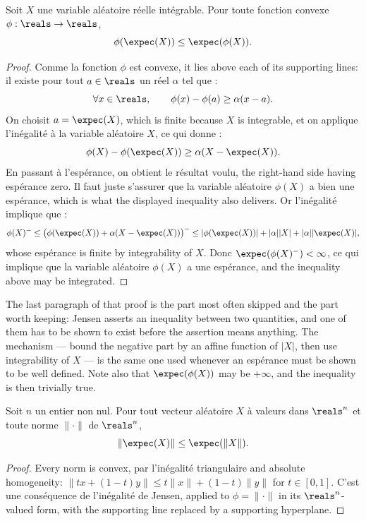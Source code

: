 \begin{theorem}
  Soit $X$ une variable aléatoire réelle intégrable. Pour toute fonction convexe
  $\phi : \reals \to \reals$,
  \[
    \phi(\expec(X)) \leq \expec(\phi(X)).
  \]
\end{theorem}

\begin{proof}
  Comme la fonction $\phi$ est convexe, it lies above each of its supporting
  lines: il existe pour tout $a \in \reals$ un réel $\alpha$ tel que :
  \[
    \forall x \in \reals, \qquad \phi(x) - \phi(a) \geq \alpha(x-a).
  \]
  On choisit $a = \expec(X)$, which is finite because $X$ is integrable, et on
  applique l'inégalité à la variable aléatoire $X$, ce qui donne :
  \[
    \phi(X) - \phi(\expec(X)) \geq \alpha (X - \expec(X)).
  \]
  En passant à l'espérance, on obtient le résultat voulu, the right-hand side
  having espérance zero. Il faut juste s'assurer que la variable aléatoire
  $\phi(X)$ a bien une espérance, which is what the displayed inequality also
  delivers. Or l'inégalité implique que :
  \[
    \phi(X)^{-} \leq \big(\phi(\expec(X)) + \alpha(X-\expec(X))\big)^{-}
      \leq |\phi(\expec(X))| + |\alpha||X| + |\alpha||\expec(X)| ,
  \]
  whose espérance is finite by integrability of $X$. Donc
  $\expec(\phi(X)^{-}) < \infty$, ce qui implique que la variable aléatoire
  $\phi(X)$ a une espérance, and the inequality above may be integrated.
\end{proof}

The last paragraph of that proof is the part most often skipped and the part
worth keeping: Jensen asserts an inequality between two quantities, and one of
them has to be shown to exist before the assertion means anything. The mechanism
--- bound the negative part by an affine function of $|X|$, then use integrability
of $X$ --- is the same one used whenever an espérance must be shown to be well
defined. Note also that $\expec(\phi(X))$ may be $+\infty$, and the inequality
is then trivially true.

\begin{corollary}
  Soit $n$ un entier non nul. Pour tout vecteur aléatoire $X$ à valeurs dans
  $\reals^{n}$ et toute norme $\|\cdot\|$ de $\reals^{n}$,
  \[
    \|\expec(X)\| \leq \expec(\|X\|).
  \]
\end{corollary}

\begin{proof}
  Every norm is convex, par l'inégalité triangulaire and absolute homogeneity:
  $\|tx + (1-t)y\| \leq t\|x\| + (1-t)\|y\|$ for $t \in [0,1]$. C'est une
  conséquence de l'inégalité de Jensen, applied to $\phi = \|\cdot\|$ in its
  $\reals^{n}$-valued form, with the supporting line replaced by a supporting
  hyperplane.
\end{proof}

